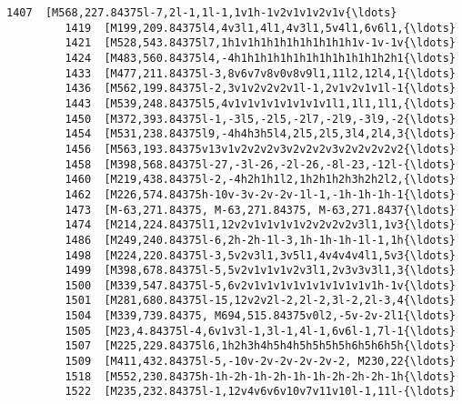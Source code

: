 \documentclass[11pt]{article}
\begin{document}
\begin{Verbatim}[commandchars=\\\{\}]
         1407  [M568,227.84375l-7,2l-1,1l-1,1v1h-1v2v1v1v2v1v{\ldots}   
         1419  [M199,209.84375l4,4v3l1,4l1,4v3l1,5v4l1,6v6l1,{\ldots}   
         1421  [M528,543.84375l7,1h1v1h1h1h1h1h1h1h1h1v-1v-1v{\ldots}   
         1424  [M483,560.84375l4,-4h1h1h1h1h1h1h1h1h1h1h1h2h1{\ldots}   
         1433  [M477,211.84375l-3,8v6v7v8v0v8v9l1,11l2,12l4,1{\ldots}   
         1436  [M562,199.84375l-2,3v1v2v2v2v1l-1,2v1v2v1v1l-1{\ldots}   
         1443  [M539,248.84375l5,4v1v1v1v1v1v1v1v1l1,1l1,1l1,{\ldots}   
         1450  [M372,393.84375l-1,-3l5,-2l5,-2l7,-2l9,-3l9,-2{\ldots}   
         1454  [M531,238.84375l9,-4h4h3h5l4,2l5,2l5,3l4,2l4,3{\ldots}   
         1456  [M563,193.84375v13v1v2v2v2v3v2v2v2v3v2v2v2v2v2{\ldots}   
         1458  [M398,568.84375l-27,-3l-26,-2l-26,-8l-23,-12l-{\ldots}   
         1460  [M219,438.84375l-2,-4h2h1h1l2,1h2h1h2h3h2h2l2,{\ldots}   
         1462  [M226,574.84375h-10v-3v-2v-2v-1l-1,-1h-1h-1h-1{\ldots}   
         1473  [M-63,271.84375, M-63,271.84375, M-63,271.8437{\ldots}   
         1474  [M214,224.84375l1,12v2v1v1v1v1v2v2v2v2v3l1,1v3{\ldots}   
         1486  [M249,240.84375l-6,2h-2h-1l-3,1h-1h-1h-1l-1,1h{\ldots}   
         1498  [M224,220.84375l-3,5v2v3l1,3v5l1,4v4v4v4l1,5v3{\ldots}   
         1499  [M398,678.84375l-5,5v2v1v1v1v2v3l1,2v3v3v3l1,3{\ldots}   
         1500  [M339,547.84375l-5,6v2v1v1v1v1v1v1v1v1v1v1h-1v{\ldots}   
         1501  [M281,680.84375l-15,12v2v2l-2,2l-2,3l-2,2l-3,4{\ldots}   
         1504  [M339,739.84375, M694,515.84375v0l2,-5v-2v-2l1{\ldots}   
         1505  [M23,4.84375l-4,6v1v3l-1,3l-1,4l-1,6v6l-1,7l-1{\ldots}   
         1507  [M225,229.84375l6,1h2h3h4h5h4h5h5h5h5h6h5h6h5h{\ldots}   
         1509  [M411,432.84375l-5,-10v-2v-2v-2v-2v-2, M230,22{\ldots}   
         1518  [M552,230.84375h-1h-2h-1h-2h-1h-1h-2h-2h-2h-1h{\ldots}   
         1522  [M235,232.84375l-1,12v4v6v6v10v7v11v10l-1,11l-{\ldots}   
         

\end{Verbatim}
\end{document}
